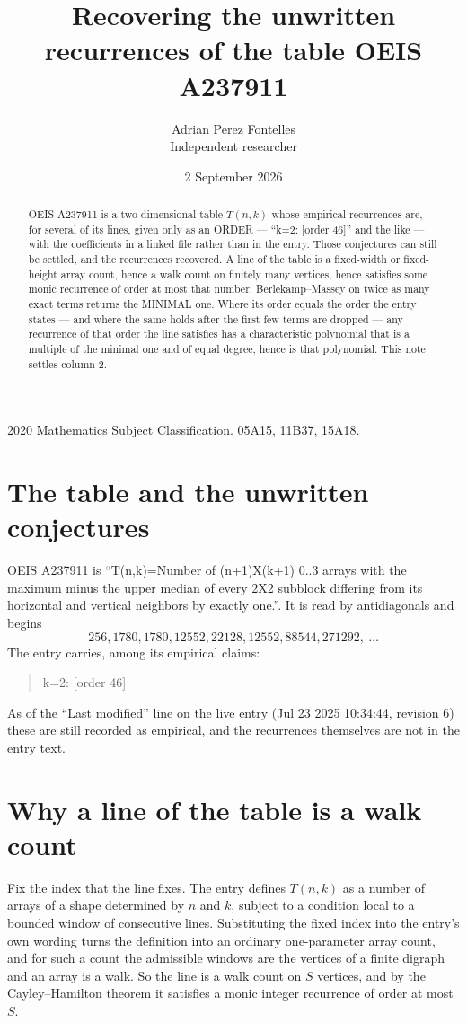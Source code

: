 \documentclass[11pt,a4paper]{article}
\title{Recovering the unwritten recurrences of the table OEIS A237911}
\author{Adrian Perez Fontelles\\ \small Independent researcher}
\date{2 September 2026}
\theoremstyle{plain}
\theoremstyle{definition}
\begin{document}
\maketitle

\begin{abstract}
OEIS A237911 is a two-dimensional table $T(n,k)$ whose empirical recurrences are, for several of
its lines, given only as an ORDER --- ``k=2: [order 46]'' and the like --- with the
coefficients in a linked file rather than in the entry. Those conjectures can still be settled,
and the recurrences recovered. A line of the table is a fixed-width or fixed-height array
count, hence a walk count on finitely many vertices, hence satisfies some monic recurrence of
order at most that number; Berlekamp--Massey on twice as many exact terms returns the MINIMAL
one. Where its order equals the order the entry states --- and where the same holds after the
first few terms are dropped --- any recurrence of that order the line satisfies has a
characteristic polynomial that is a multiple of the minimal one and of equal degree, hence is
that polynomial. This note settles column 2.
\end{abstract}

\noindent\small 2020 Mathematics Subject Classification. 05A15, 11B37, 15A18.\normalsize

\section{The table and the unwritten conjectures}

OEIS A237911 is ``T(n,k)=Number of (n+1)X(k+1) 0..3 arrays with the maximum minus the upper median of every 2X2 subblock differing from its horizontal and vertical neighbors by exactly one.''. It is read by antidiagonals and begins
\[
256, 1780, 1780, 12552, 22128, 12552, 88544, 271292,\ \dots
\]
The entry carries, among its empirical claims:
\begin{quote}\small
k=2: [order 46]
\end{quote}
As of the ``Last modified'' line on the live entry (Jul 23 2025 10:34:44, revision 6) these are still
recorded as empirical, and the recurrences themselves are not in the entry text.

\section{Why a line of the table is a walk count}

Fix the index that the line fixes. The entry defines $T(n,k)$ as a number of arrays of a shape
determined by $n$ and $k$, subject to a condition local to a bounded window of consecutive
lines. Substituting the fixed index into the entry's own wording turns the definition into an
ordinary one-parameter array count, and for such a count the admissible windows are the
vertices of a finite digraph and an array is a walk. So the line is a walk count on $S$
vertices, and by the Cayley--Hamilton theorem it satisfies a monic integer recurrence of order
at most $S$.
\end{document}
